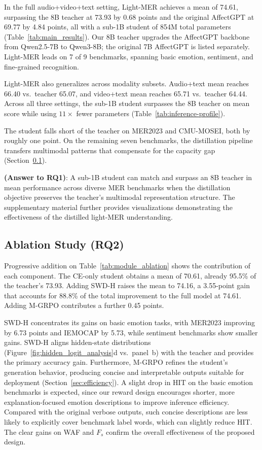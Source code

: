 \documentclass[sigconf]{acmart}
\begin{document}
In the full audio+video+text setting, Light-MER achieves a mean of 74.61, surpassing the 8B teacher at 73.93 by 0.68 points and the original AffectGPT at 69.77 by 4.84 points, all with a sub-1B student of 854M total parameters (Table~\ref{tab:main_results}). Our 8B teacher upgrades the AffectGPT backbone from Qwen2.5-7B to Qwen3-8B; the original 7B AffectGPT is listed separately. Light-MER leads on 7 of 9 benchmarks, spanning basic emotion, sentiment, and fine-grained recognition.

Light-MER also generalizes across modality subsets. Audio+text mean reaches 66.40 vs.\ teacher 65.07, and video+text mean reaches 65.71 vs.\ teacher 64.44. Across all three settings, the sub-1B student surpasses the 8B teacher on mean score while using $11\times$ fewer parameters (Table~\ref{tab:inference-profile}).

The student falls short of the teacher on MER2023 and CMU-MOSEI, both by roughly one point. On the remaining seven benchmarks, the distillation pipeline transfers multimodal patterns that compensate for the capacity gap (Section~\ref{sec:ablation}).

\textbf{(Answer to RQ1)}: A sub-1B student can match and surpass an 8B teacher in mean performance across diverse MER benchmarks when the distillation objective preserves the teacher's multimodal representation structure. The supplementary material further provides visualizations demonstrating the effectiveness of the distilled light-MER understanding.

\subsection{Ablation Study (RQ2)}
\label{sec:ablation}

Progressive addition on Table~\ref{tab:module_ablation} shows the contribution of each component. The CE-only student obtains a mean of 70.61, already 95.5\% of the teacher's 73.93. Adding SWD-H raises the mean to 74.16, a 3.55-point gain that accounts for 88.8\% of the total improvement to the full model at 74.61. Adding M-GRPO contributes a further 0.45 points.

SWD-H concentrates its gains on basic emotion tasks, with MER2023 improving by 6.73 points and IEMOCAP by 5.73, while sentiment benchmarks show smaller gains.  SWD-H aligns hidden-state distributions (Figure~\ref{fig:hidden_logit_analysis}d vs.\ panel~b) with the teacher and provides the primary accuracy gain. 
Furthermore, M-GRPO refines the student's generation behavior, producing concise and interpretable outputs suitable for deployment  (Section~\ref{sec:efficiency}). A slight drop in HIT on the basic emotion benchmarks is expected, since our reward design encourages shorter, more explanation-focused emotion descriptions to improve inference efficiency. Compared with the original verbose outputs, such concise descriptions are less likely to explicitly cover benchmark label words, which can slightly reduce HIT. The clear gains on WAF and $F_s$ confirm the overall effectiveness of the proposed design.
\end{document}
